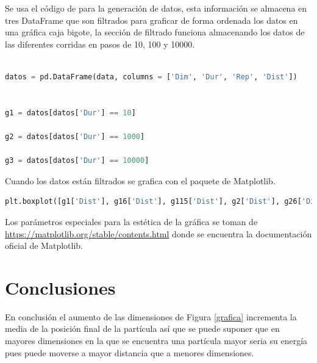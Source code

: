 \documentclass{article}
\begin{document}
Se usa el código de \cite{elis} para la generación de datos, esta información se almacena en tres DataFrame que son filtrados para graficar de forma ordenada los datos en una gráfica caja bigote, la sección de filtrado funciona almacenando los datos de las diferentes corridas en pasos de 10, 100 y 10000.

 
\begin{lstlisting}[language = python]

datos = pd.DataFrame(data, columns = ['Dim', 'Dur', 'Rep', 'Dist'])


g1 = datos[datos['Dur'] == 10]

g2 = datos[datos['Dur'] == 1000]

g3 = datos[datos['Dur'] == 10000]
\end{lstlisting}


Cuando los datos están filtrados se grafica con el paquete de Matplotlib.

\begin{lstlisting}[language = python]
plt.boxplot([g1['Dist'], g16['Dist'], g115['Dist'], g2['Dist'], g26['Dist'], g215['Dist'], g3['Dist'], g36['Dist'], g315['Dist']], patch_artist=True, boxprops=dict(facecolor=c, color=c))
\end{lstlisting}

Los parámetros especiales para la estética de la gráfica se toman de \url{https://matplotlib.org/stable/contents.html} donde se encuentra la documentación oficial de Matplotlib.

\section{Conclusiones}

En conclusión el aumento de las dimensiones de Figura \ref{grafica} incrementa la media de la posición final de la partícula así que se puede suponer que en mayores dimensiones en la que se encuentra una partícula mayor seria su energía pues puede moverse a mayor distancia que a menores dimensiones.


\end{document}
